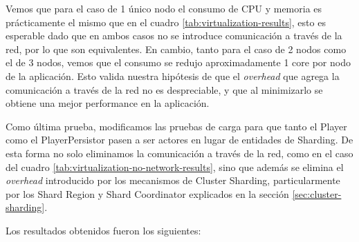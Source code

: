 Vemos que para el caso de 1 único nodo el consumo de CPU y memoria es prácticamente el mismo que en el cuadro \ref{tab:virtualization-results}, esto es esperable dado que en ambos casos no se introduce comunicación a través de la red, por lo que
son equivalentes. En cambio, tanto para el caso de 2 nodos como el de 3 nodos, vemos que el consumo se redujo aproximadamente 1 core por nodo de la aplicación. Esto valida nuestra hipótesis de que el \textit{overhead} que agrega la comunicación a través
de la red no es despreciable, y que al minimizarlo se obtiene una mejor performance en la aplicación.

Como última prueba, modificamos las pruebas de carga para que tanto el Player como el PlayerPersistor pasen a ser actores en lugar de entidades de Sharding. De esta forma no solo eliminamos la comunicación a través de la red, como en el caso del cuadro \ref{tab:virtualization-no-network-results},
sino que además se elimina el \textit{overhead} introducido por los mecanismos de Cluster Sharding, particularmente por los Shard Region y Shard Coordinator explicados en la sección \ref{sec:cluster-sharding}.

Los resultados obtenidos fueron los siguientes:

\newpage

